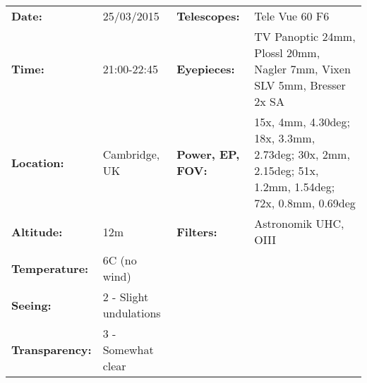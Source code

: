 \begin{tabular}{ p{0.9in} p{1.3in} p{1.2in} p{5.2in}}
{\bf Date:} & 25/03/2015 & {\bf Telescopes:} & Tele Vue 60 F6 \\ 
{\bf Time:} & 21:00-22:45 & {\bf Eyepieces:} & TV Panoptic 24mm, Plossl 20mm, Nagler 7mm, Vixen SLV 5mm, Bresser 2x SA \\ 
{\bf Location:} & Cambridge, UK & {\bf Power, EP, FOV:} & 15x, 4mm, 4.30deg; 18x, 3.3mm, 2.73deg; 30x, 2mm, 2.15deg; 51x, 1.2mm, 1.54deg; 72x, 0.8mm, 0.69deg \\ 
{\bf Altitude:} & 12m & {\bf Filters:} & Astronomik UHC, OIII \\ 
{\bf Temperature:} & 6C (no wind) & & \\ 
{\bf Seeing:} & 2 - Slight undulations & & \\ 
{\bf Transparency:} & 3 - Somewhat clear & & \\ 
\end{tabular}
